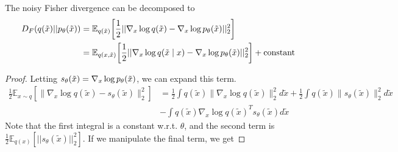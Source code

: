     \begin{theorem}
      The noisy Fisher divergence can be decomposed to
      \begin{align}
        D_F (q(\Tilde{x}) || p_\theta(\Tilde{x})) & = \mathbb{E}_{q(\Tilde{x})} \bigg[ \frac{1}{2} || \nabla_x \log q(\Tilde{x}) - \nabla_x \log p_\theta (\Tilde{x})||_2^2 \bigg] \\
                                                  & = \mathbb{E}_{q(x, \Tilde{x})} \bigg[ \frac{1}{2} || \nabla_x \log q(\Tilde{x} \mid x) - \nabla_x \log p_\theta (\Tilde{x})||_2^2 \bigg] + \mathrm{constant}
      \end{align}
    \end{theorem}
    \begin{proof}
      Letting $s_\theta (\Tilde{x}) = \nabla_x \log p_\theta (\Tilde{x})$, we can expand this term. 
      \begin{align}
        \frac{1}{2} \mathbb{E}_{x\sim q}\left[\|\nabla_x \log q(\tilde{x}) - s_\theta(\tilde{x})\|_2^2\right] & = \frac{1}{2}\int q(\tilde{x})\|\nabla_x \log q(\tilde{x})\|_2^2 d\tilde{x} + \frac{1}{2}\int q(\tilde{x})\|s_\theta(\tilde{x})\|_2^2 d\tilde{x} \\ 
                                                                                                     & - \int q(\tilde{x})\nabla_x \log q(\tilde{x})^T s_\theta(\tilde{x}) d\tilde{x}
      \end{align}
      Note that the first integral is a constant w.r.t. $\theta$, and the second term is $\frac{1}{2} \mathbb{E}_{q(x)} [||s_\theta (\tilde{x})||_2^2]$. If we manipulate the final term, we get 


\end{proof}
